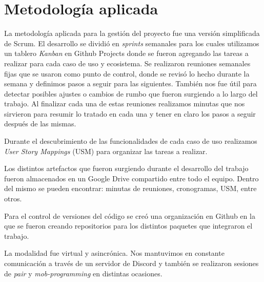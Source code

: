 \section{Metodología aplicada}

La metodología aplicada para la gestión del proyecto fue una versión simplificada de Scrum. El desarrollo se dividió en \textit{sprints} semanales para los cuales utilizamos un tablero \textit{Kanban} en Github Projects donde se fueron agregando las tareas a realizar para cada caso de uso y ecosistema. Se realizaron reuniones semanales fijas que se usaron como punto de control, donde se revisó lo hecho durante la semana y definimos pasos a seguir para las siguientes. También nos fue útil para detectar posibles ajustes o cambios de rumbo que fueron surgiendo a lo largo del trabajo. Al finalizar cada una de estas reuniones realizamos minutas que nos sirvieron para resumir lo tratado en cada una y tener en claro los pasos a seguir después de las mismas.

Durante el descubrimiento de las funcionalidades de cada caso de uso realizamos \textit{User Story Mappings} (USM) para organizar las tareas a realizar.

Los distintos artefactos que fueron surgiendo durante el desarrollo del trabajo fueron almacenados en un Google Drive compartido entre todo el equipo. Dentro del mismo se pueden encontrar: minutas de reuniones, cronogramas, USM, entre otros.

Para el control de versiones del código se creó una organización en Github en la que se fueron creando repositorios para los distintos paquetes que integraron el trabajo.

La modalidad fue virtual y asincrónica. Nos mantuvimos en constante comunicación a través de un servidor de Discord y también se realizaron sesiones de \textit{pair} y \textit{mob-programming} en distintas ocasiones.